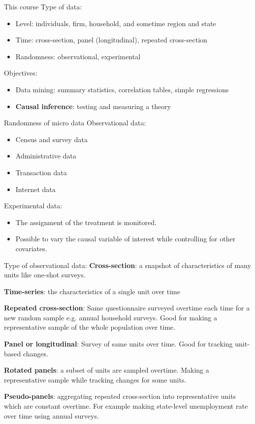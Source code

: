 \documentclass[handout]{beamer}
\begin{document}
\begin{frame}{This course}
Type of data:

\begin{itemize}
	\item Level: individuals, firm, household, and sometime region and state
	\item Time: cross-section, panel (longitudinal), repeated cross-section
	\item Randomness: observational, experimental
\end{itemize}\bigskip\pause


Objectives:
\begin{itemize}
	\item Data mining: summary statistics, correlation tables, simple regressions
	\item \textbf{Causal inference}: testing and measuring a theory
\end{itemize}

\end{frame}


\begin{frame}{Randomness of micro data}
Observational data:

\begin{itemize}
	\item Census and survey data
	\item Administrative data
	\item Transaction data
	\item Internet data
\end{itemize}\bigskip

Experimental data:
\begin{itemize}
	\item The assignment of the treatment is monitored.
	\item Possible to vary the causal variable of interest while controlling for other covariates.
\end{itemize}
\end{frame}

\begin{frame}{Type of observational data:}
\textbf{Cross-section}: a snapshot of characteristics of many units like one-shot surveys.\bigskip

\textbf{Time-series}: the characteristics of a single unit over time\bigskip

\textbf{Repeated cross-section}: Same questionnaire surveyed overtime each time for a new random sample e.g. annual household surveys. Good for making a representative sample of the whole population over time.\bigskip

\textbf{Panel or longitudinal}: Survey of same units over time. Good for tracking unit-based changes.\bigskip

\textbf{Rotated panels}: a subset of units are sampled overtime. Making a representative sample while tracking changes for some units.\bigskip

\textbf{Pseudo-panels}: aggregating repeated cross-section into representative units which are constant overtime. For example making state-level unemployment rate over time using annual surveys.
\end{frame}
\end{document}
